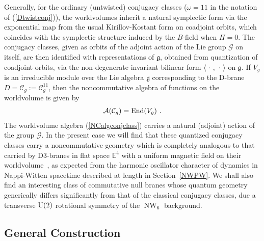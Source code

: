 \documentclass[11pt,a4paper]{article}
\DeclareMathOperator{\NW}{NW}
\newcommand{\eucl}{{\mathbb E}}
\newcommand{\id}{{1\!\!1}} %
\newcommand{\beq}{\begin{eqnarray}}
\newcommand{\eeq}{\end{eqnarray}}
\begin{document}
Generally, for the ordinary (untwisted) conjugacy classes
($\omega=\id$ in the notation of (\ref{Dtwistconj})), the
worldvolumes inherit a natural symplectic form via the exponential map
from the usual Kirillov-Kostant form on coadjoint orbits, which
coincides with the symplectic structure induced by the $B$-field when
$H=0$. The conjugacy classes, given as orbits of the adjoint action of the Lie
group $\mathcal{G}$ on itself, are then identified with representations of
$\mathfrak{g}$, obtained from quantization of coadjoint orbits, via
the non-degenerate invariant bilinear form
$\langle\,\cdot\,,\,\cdot\,\rangle$ on $\mathfrak{g}$. If $V_g$ is an
irreducible module over the Lie algebra $\mathfrak{g}$ corresponding
to the D-brane $D=\mathcal{C}^{~}_g:=\mathcal{C}_g^{\id}$, then the
noncommutative algebra of functions on the worldvolume is given
by~\cite{ARS1}
\beq
\mathcal{A}(\mathcal{C}_g)={\rm End}(V_g) \ .
\label{NCalgconjclass}\eeq
The worldvolume algebra (\ref{NCalgconjclass}) carries a natural
(adjoint) action of the group $\mathcal{G}$. In the present case we
will find that these quantized conjugacy
classes carry a noncommutative geometry which is completely
analogous to that carried by D3-branes in flat space $\eucl^4$ with a
uniform magnetic field on their worldvolume~\cite{DNek1,SW1,Sz1,Sz2},
as expected from the harmonic oscillator character of dynamics in
Nappi-Witten spacetime described at length in Section~\ref{NWPW}. We
shall also find an interesting class of commutative null branes whose
quantum geometry generically differs significantly from that of the
classical conjugacy classes, due a transverse ${\rm U}(2)$ rotational
symmetry of the $\NW_6$ background.

\subsection{General Construction\label{GenConstrUntwist}}
\end{document}
